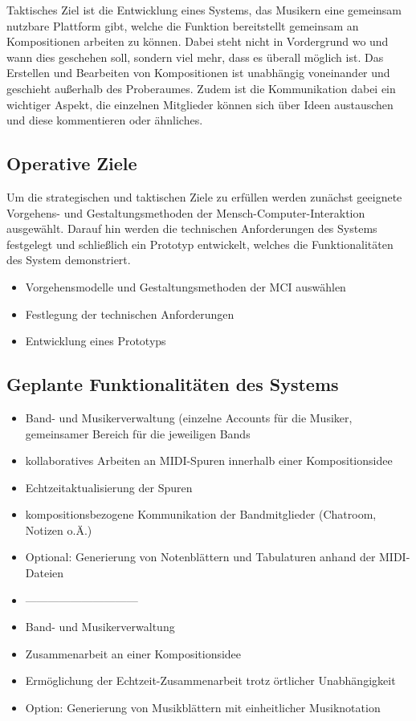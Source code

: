 \documentclass[12pt]{scrartcl}
\begin{document}
Taktisches Ziel ist die Entwicklung eines Systems, das Musikern eine gemeinsam nutzbare Plattform gibt, welche die Funktion bereitstellt gemeinsam an Kompositionen arbeiten zu können. Dabei steht nicht in Vordergrund wo und wann dies geschehen soll, sondern viel mehr, dass es überall möglich ist. Das Erstellen und Bearbeiten von Kompositionen ist unabhängig voneinander und geschieht außerhalb des Proberaumes. 
Zudem ist die Kommunikation dabei ein wichtiger Aspekt, die einzelnen Mitglieder können sich über Ideen austauschen und diese kommentieren oder ähnliches.

\subsection{Operative Ziele}

Um die strategischen und taktischen Ziele zu erfüllen werden zunächst geeignete Vorgehens- und Gestaltungsmethoden der Mensch-Computer-Interaktion ausgewählt. Darauf hin werden die technischen Anforderungen des Systems festgelegt und schließlich ein Prototyp entwickelt, welches die Funktionalitäten des System demonstriert.

\begin{itemize}
\item Vorgehensmodelle und Gestaltungsmethoden der MCI auswählen
\item Festlegung der technischen Anforderungen
\item Entwicklung eines Prototyps 
\end{itemize}


\subsection[Geplante Funktionalitäten]{Geplante Funktionalitäten des Systems}

\begin{itemize}
\item Band- und Musikerverwaltung (einzelne Accounts für die Musiker, gemeinsamer Bereich für die jeweiligen Bands
\item kollaboratives Arbeiten an MIDI-Spuren innerhalb einer Kompositionsidee
\item Echtzeitaktualisierung der Spuren
\item kompositionsbezogene Kommunikation der Bandmitglieder (Chatroom, Notizen o.Ä.)
\item Optional: Generierung von Notenblättern und Tabulaturen anhand der MIDI-Dateien
\item ------------------------------
\item Band- und Musikerverwaltung
\item Zusammenarbeit an einer Kompositionsidee 
\item Ermöglichung der Echtzeit-Zusammenarbeit trotz örtlicher Unabhängigkeit
\item Option: Generierung von Musikblättern mit einheitlicher Musiknotation
\end{itemize}
\end{document}
